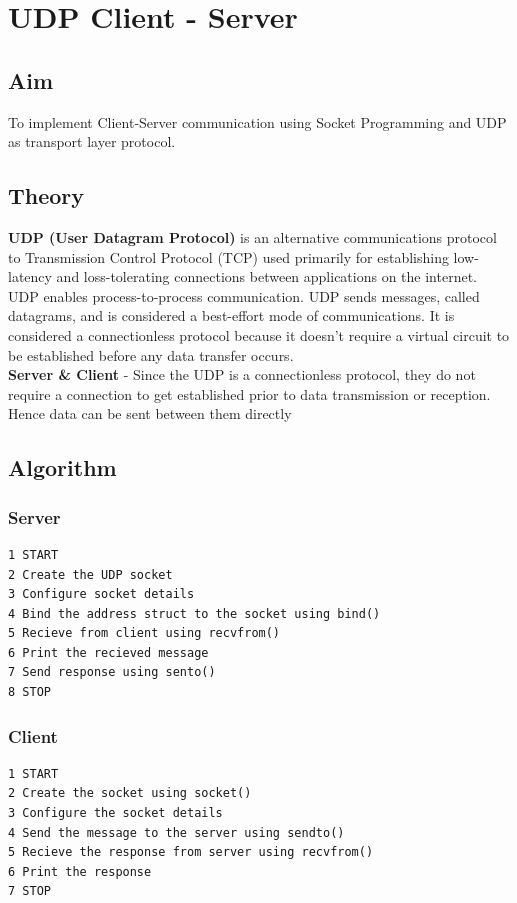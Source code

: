 \section{UDP Client - Server}
\subsection{Aim}
To implement Client-Server communication using Socket Programming and UDP as
transport layer protocol.

\subsection{Theory}
\textbf{UDP (User Datagram Protocol)} is an alternative communications protocol to
Transmission Control Protocol (TCP) used primarily for establishing low-latency
and loss-tolerating connections between applications on the internet. UDP enables
process-to-process communication. UDP sends messages, called datagrams, and is
considered a best-effort mode of communications. It is considered a connectionless
protocol because it doesn’t require a virtual circuit to be established before any data
transfer occurs.\\
\textbf{Server \& Client} - Since the UDP is a connectionless protocol, they do not require a connection 
to get established prior to data transmission or reception. Hence
data can be sent between them directly

\subsection{Algorithm}
\subsubsection{Server}
\begin{verbatim}
1 START
2 Create the UDP socket
3 Configure socket details
4 Bind the address struct to the socket using bind()
5 Recieve from client using recvfrom()
6 Print the recieved message
7 Send response using sento()
8 STOP
\end{verbatim}

\subsubsection{Client}
\begin{verbatim}
1 START
2 Create the socket using socket()
3 Configure the socket details
4 Send the message to the server using sendto()
5 Recieve the response from server using recvfrom()
6 Print the response
7 STOP
\end{verbatim}

